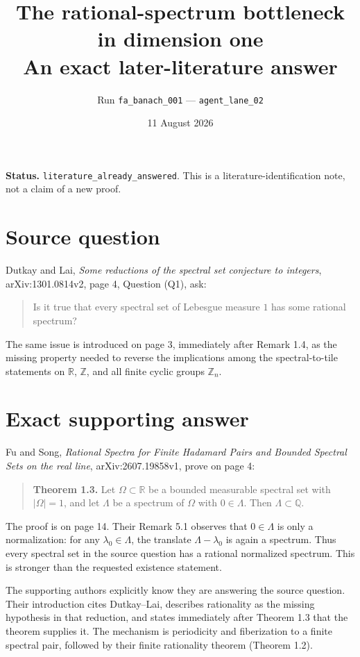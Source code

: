 \documentclass[11pt]{article}
\title{The rational-spectrum bottleneck in dimension one\\
\large An exact later-literature answer}
\author{Run \texttt{fa\_banach\_001} --- \texttt{agent\_lane\_02}}
\date{11 August 2026}
\begin{document}
\maketitle

\textbf{Status.} \texttt{literature\_already\_answered}. This is a
literature-identification note, not a claim of a new proof.

\section*{Source question}

Dutkay and Lai, \emph{Some reductions of the spectral set conjecture to
integers}, arXiv:1301.0814v2, page 4, Question (Q1), ask:
\begin{quote}
Is it true that every spectral set of Lebesgue measure $1$ has some rational
spectrum?
\end{quote}
The same issue is introduced on page 3, immediately after Remark 1.4, as the
missing property needed to reverse the implications among the spectral-to-tile
statements on $\mathbb R$, $\mathbb Z$, and all finite cyclic groups
$\mathbb Z_n$.

\section*{Exact supporting answer}

Fu and Song, \emph{Rational Spectra for Finite Hadamard Pairs and Bounded
Spectral Sets on the real line}, arXiv:2607.19858v1, prove on page 4:
\begin{quote}
\textbf{Theorem 1.3.} Let $\Omega\subset\mathbb R$ be a bounded measurable
spectral set with $|\Omega|=1$, and let $\Lambda$ be a spectrum of $\Omega$
with $0\in\Lambda$. Then $\Lambda\subset\mathbb Q$.
\end{quote}
The proof is on page 14. Their Remark 5.1 observes that $0\in\Lambda$ is only a
normalization: for any $\lambda_0\in\Lambda$, the translate
$\Lambda-\lambda_0$ is again a spectrum. Thus every spectral set in the source
question has a rational normalized spectrum. This is stronger than the
requested existence statement.

The supporting authors explicitly know they are answering the source question.
Their introduction cites Dutkay--Lai, describes rationality as the missing
hypothesis in that reduction, and states immediately after Theorem 1.3 that the
theorem supplies it. The mechanism is periodicity and fiberization to a finite
spectral pair, followed by their finite rationality theorem (Theorem 1.2).
\end{document}
